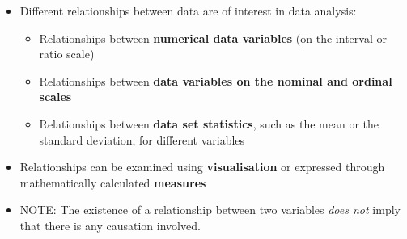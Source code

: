 



\setlength\parskip{1ex}

\graphicspath{ {../Common/images/} }

\graphicspath{ {images/} }

\pgclryellow
\title{}
\author{\vspace{3cm} Institute of Technology Tallaght}
\date{Department of Computing}
\maketitle
\newpage

\begin{itemize}
\item Different relationships between data are of interest in data analysis:
  \begin{itemize}
  \item Relationships between \textbf{numerical data variables} (on the interval or ratio scale)
  \item Relationships between \textbf{data variables  on the nominal and ordinal scales}
  \item Relationships between \textbf{data set statistics}, such as the mean or  the standard deviation, for different variables
  \end{itemize}
\item Relationships can be examined using \textbf{visualisation} or expressed through mathematically calculated \textbf{measures}
\item NOTE: The existence of a relationship between two variables \emph{does not} imply that there is any causation involved.
\end{itemize}
\newpage


